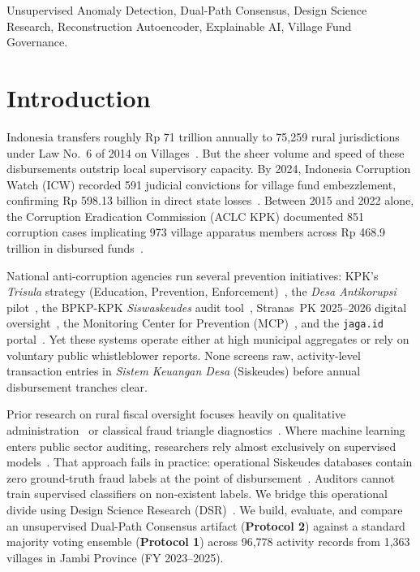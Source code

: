 \documentclass[conference]{IEEEtran}
\begin{document}
\begin{IEEEkeywords}
Unsupervised Anomaly Detection, Dual-Path Consensus, Design Science Research, Reconstruction Autoencoder, Explainable AI, Village Fund Governance.
\end{IEEEkeywords}

\section{Introduction}

Indonesia transfers roughly Rp 71 trillion annually to 75,259 rural jurisdictions under Law No.\ 6 of 2014 on Villages~\cite{ref1}. But the sheer volume and speed of these disbursements outstrip local supervisory capacity. By 2024, Indonesia Corruption Watch (ICW) recorded 591 judicial convictions for village fund embezzlement, confirming Rp 598.13 billion in direct state losses~\cite{ref2}. Between 2015 and 2022 alone, the Corruption Eradication Commission (ACLC KPK) documented 851 corruption cases implicating 973 village apparatus members across Rp 468.9 trillion in disbursed funds~\cite{ref3}.

National anti-corruption agencies run several prevention initiatives: KPK's \textit{Trisula} strategy (Education, Prevention, Enforcement)~\cite{ref36}, the \textit{Desa Antikorupsi} pilot~\cite{ref37}, the BPKP-KPK \textit{Siswaskeudes} audit tool~\cite{ref38}, Stranas~PK 2025--2026 digital oversight~\cite{ref39}, the Monitoring Center for Prevention (MCP)~\cite{ref40}, and the \texttt{jaga.id} portal~\cite{ref26}. Yet these systems operate either at high municipal aggregates or rely on voluntary public whistleblower reports. None screens raw, activity-level transaction entries in \textit{Sistem Keuangan Desa} (Siskeudes) before annual disbursement tranches clear.

Prior research on rural fiscal oversight focuses heavily on qualitative administration~\cite{ref4,ref5} or classical fraud triangle diagnostics~\cite{ref6}. Where machine learning enters public sector auditing, researchers rely almost exclusively on supervised models~\cite{ref13,ref14}. That approach fails in practice: operational Siskeudes databases contain zero ground-truth fraud labels at the point of disbursement~\cite{ref16,ref23}. Auditors cannot train supervised classifiers on non-existent labels. We bridge this operational divide using Design Science Research (DSR)~\cite{ref5,ref10}. We build, evaluate, and compare an unsupervised Dual-Path Consensus artifact (\textbf{Protocol 2}) against a standard majority voting ensemble (\textbf{Protocol 1}) across 96,778 activity records from 1,363 villages in Jambi Province (FY 2023--2025).
\end{document}
